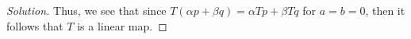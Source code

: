 \documentclass{article}
\newenvironment{solution}{\begin{proof}[Solution]}{\end{proof}}
\newcommand{\RR}{\mathbb{R}}
\begin{document}
\begin{solution}
		Thus, we see that since $T(\alpha p + \beta q) = \alpha Tp + \beta Tq$ for $a=b=0$, then it follows that $T$ is a linear map.
	
	
	\begin{comment}
			In order for the map to be linear, it must be that for $p,q \in \mathscr{P}(\RR)$ and $\alpha, \beta \in \RR$, we have the following:
		\begin{equation*}
			T(\alpha p + \beta q) = \alpha Tp + \beta Tq \\
		\end{equation*}
	
		For the sake of legibility, we will be looking at the first and second component of the vector yielded by $T_{p}$ separately.
		
		First, we observe that for $T_{p}(\alpha p + \beta q)$, we get for the first component:
		\begin{align*}
			2(\alpha p + \beta q)(2) + 5(\alpha p + \beta q)'(2) + a(\alpha p + \beta q)(-1)(\alpha p + \beta q)(3) \\
			2\alpha p(1) + 2\beta q(1) + 5\alpha p'(2) + 5\beta q'(2) + a(\alpha p(-1) + \beta q(-1))(\alpha p(3) + \beta q(3)) %
		\end{align*}
	
		However, for $\alpha T_{p}(p) + \beta T_{p}(q)$, we get:
		\begin{align*}
			\alpha(2p(1) + 5p'(2) + ap(-1)p(3)) + \beta(2q(1) + 5q'(2) + aq(-1)q(3)) \\
			2\alpha p(1) + 5\alpha p'(2) + a\alpha p(-1)p(3) + 2\beta q(1) + 5\beta q'(2) + a\beta q(-1)q(3) \\
			2\alpha p(1) + 2\beta q(1) + 5\alpha p'(2) + 5\beta q'(2) + a(\alpha p(-1)p(3) + \beta q(-1)q(3))
		\end{align*}
	
		We see then that the $a(\alpha p(-1)p(3) + \beta q(-1)q(3)) \not= a(\alpha p(-1) + \beta q(-1))(\alpha p(3) + \beta q(3))$, for $a \not= 0$. Thus, we must have that $a = 0$ for the map to be linear (for the first component)
		
		For the second component, we see that for $T_{p}(\alpha p + \beta q)$, we get:
		\begin{align*}
			\int_{-1}^{1} x^{3}(\alpha p + \beta q)(x)\mathrm dx + b \sin (\alpha p + \beta q)(0) \\
			\alpha \int_{-1}^{1} x^{3} p(x) \mathrm dx + \beta \int_{-1}^{1} x^{3} q(x) \mathrm dx + b \sin (\alpha p(0) + \beta q(0))
		\end{align*}
	

\end{comment}
\end{solution}
\end{document}
